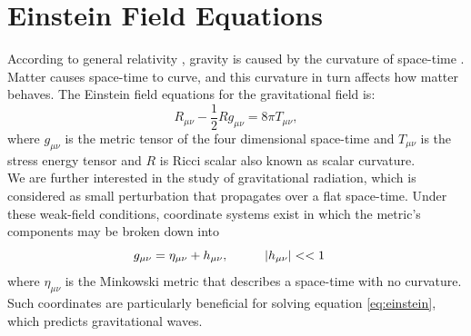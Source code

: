 \onehalfspacing

\section{Einstein Field Equations}
According to general relativity
, gravity is caused by the curvature of space-time \citep{misner2017gravitation}\citep{thesis}. Matter causes space-time to curve, and this curvature in turn affects how matter behaves.
The Einstein field equations for the gravitational field is:
\begin{equation}
    R_{\mu \nu}-\frac{1}{2} Rg_{\mu \nu} = 8\pi T_{\mu \nu},
    \label{eq:einstein}
\end{equation}
where $g_{\mu \nu}$ is the metric tensor of the four dimensional space-time and $T_{\mu \nu}$ is the stress energy tensor and $R$ is Ricci scalar also known as scalar curvature.\\
We are further interested in the study of gravitational radiation, which is considered as small perturbation that propagates over a flat space-time. Under these weak-field conditions, coordinate systems exist in which the metric's components may be broken down into
\begin{equation}
    g_{\mu \nu} = \eta_{\mu \nu} + h_{\mu \nu}, \hspace{1cm}  |h_{\mu \nu}|<< 1 \hspace{0.4cm}   
    \label{eq: metric}
\end{equation}
where $\eta_{\mu \nu}$ is the Minkowski metric that describes a space-time with no curvature. Such coordinates are particularly beneficial for solving equation \ref{eq:einstein}, which predicts gravitational waves.
